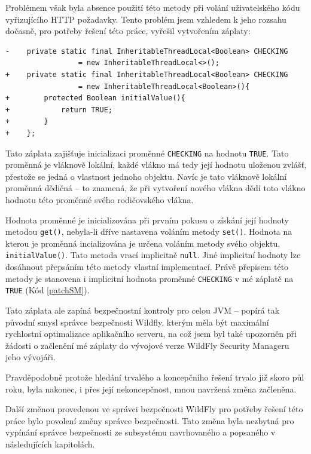 Problémem však byla absence použití této metody při volání uživatelského kódu vyřizujícího HTTP požadavky. Tento problém jsem vzhledem k jeho rozsahu dočasně, pro potřeby řešení této práce, vyřešil vytvořením záplaty:

\begin{lstlisting}[caption=Záplata správce bezpečnosti WildFly nastavující bezpečnostní kontroly na implicitně zapnuté, label=patchSM]
-    private static final InheritableThreadLocal<Boolean> CHECKING
                 = new InheritableThreadLocal<>();
+    private static final InheritableThreadLocal<Boolean> CHECKING
                 = new InheritableThreadLocal<Boolean>(){
+        protected Boolean initialValue(){
+            return TRUE;
+        }
+    };
\end{lstlisting}

Tato záplata zajišťuje inicializaci proměnné {\tt CHECKING} na hodnotu {\tt TRUE}. Tato proměnná je vláknově lokální, každé vlákno má tedy její hodnotu uloženou zvlášť, přestože se jedná o vlastnost jednoho objektu. Navíc je tato vláknově lokální proměnná dědičná -- to znamená, že při vytvoření nového vlákna dědí toto vlákno hodnotu této proměnné svého rodičovského vlákna. \cite{refInheritableThreadLocal}\cite{refThreadLocal}

Hodnota proměnné je inicializována při prvním pokusu o získání její hodnoty metodou {\tt get()}, nebyla-li dříve nastavena voláním metody {\tt set()}. Hodnota na kterou je proměnná incializována je určena voláním metody svého objektu, {\tt initialValue()}. Tato metoda vrací implicitně {\tt null}. Jiné implicitní hodnoty lze dosáhnout přepsáním této metody vlastní implementací. Právě přepisem této metody je stanovena i implicitní hodnota proměnné {\tt CHECKING} v mé záplatě na {\tt TRUE} (Kód \ref{patchSM}). \cite{refThreadLocal}

Tato záplata ale zapíná bezpečnostní kontroly pro celou JVM -- popírá tak původní smysl správce bezpečnosti Wildfly, kterým měla být maximální rychlostní optimalizace aplikačního serveru, na což jsem byl také upozorněn při žádosti o začlenění mé záplaty do vývojové verze WildFly Security Manageru jeho vývojáři. \cite{smPullRequest}

Pravděpodobně protože hledání trvalého a koncepčního řešení trvalo již skoro půl roku, byla nakonec, i přes její nekoncepčnost, mnou navržená změna začleněna. \cite{smPullRequest}\cite{smPullRequestImpl}

Další změnou provedenou ve správci bezpečnosti WildFly pro potřeby řešení této práce bylo povolení změny správce bezpečnosti. Tato změna byla nezbytná pro vypínání správce bezpečnosti ze subsystému navrhovaného a popsaného v následujících kapitolách.

